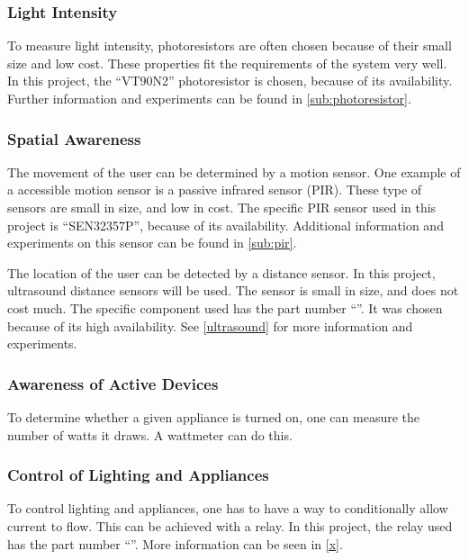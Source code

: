 \subsubsection{Light Intensity}
To measure light intensity, photoresistors are often chosen because of their small size and low cost. These properties fit the requirements of the system very well. In this project, the \enquote{VT90N2} photoresistor is chosen, because of its availability. Further information and experiments can be found in \cref{sub:photoresistor}.

\subsubsection{Spatial Awareness}
The movement of the user can be determined by a motion sensor. One example of a accessible motion sensor is a passive infrared sensor (PIR). These type of sensors are small in size, and low in cost. The specific PIR sensor used in this project is \enquote{SEN32357P}, because of its availability. Additional information and experiments on this sensor can be found in \cref{sub:pir}.

The location of the user can be detected by a distance sensor. In this project, ultrasound distance sensors will be used. The sensor is small in size, and does not cost much. The specific component used has the part number \enquote{}. It was chosen because of its high availability. See \cref{ultrasound} for more information and experiments.

\subsubsection{Awareness of Active Devices}
To determine whether a given appliance is turned on, one can measure the number of watts it draws. A wattmeter can do this.

\subsubsection{Control of Lighting and Appliances}
To control lighting and appliances, one has to have a way to conditionally allow current to flow. This can be achieved with a relay. In this project, the relay used has the part number \enquote{}. More information can be seen in \cref{x}.

